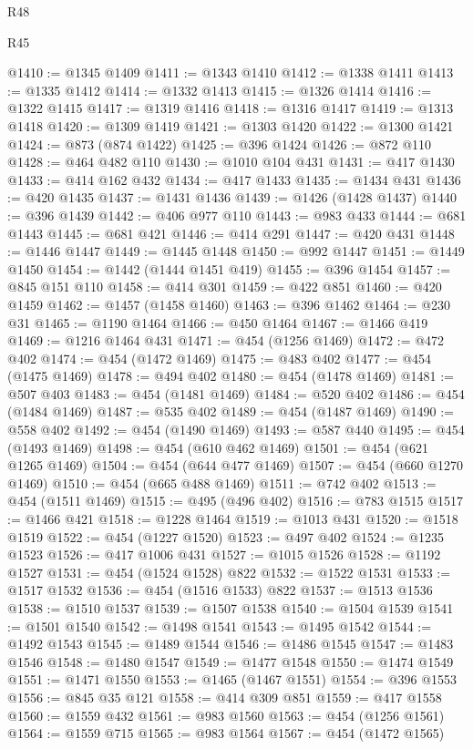 \begin{lexlean}{R48}
\begin{lexlean}{R45}
\begin{coremodule}
{{{{{{{{{{{{{{{{{{{{{{{{{{{{{{{{{{{{{{{{{{{{{{{{{{{{{{{{{{{{{{{{{{{{{{{{{{{{{{{{{{{{{{{{{{{@1410 := @1345 @1409
@1411 := @1343 @1410
@1412 := @1338 @1411
@1413 := @1335 @1412
@1414 := @1332 @1413
@1415 := @1326 @1414
@1416 := @1322 @1415
@1417 := @1319 @1416
@1418 := @1316 @1417
@1419 := @1313 @1418
@1420 := @1309 @1419
@1421 := @1303 @1420
@1422 := @1300 @1421
@1424 := @873 (@874 @1422)
@1425 := @396 @1424
@1426 := @872 @110
@1428 := @464 @482 @110
@1430 := @1010 @104 @431
@1431 := @417 @1430
@1433 := @414 @162 @432
@1434 := @417 @1433
@1435 := @1434 @431
@1436 := @420 @1435
@1437 := @1431 @1436
@1439 := @1426 (@1428 @1437)
@1440 := @396 @1439
@1442 := @406 @977 @110
@1443 := @983 @433
@1444 := @681 @1443
@1445 := @681 @421
@1446 := @414 @291
@1447 := @420 @431
@1448 := @1446 @1447
@1449 := @1445 @1448
@1450 := @992 @1447
@1451 := @1449 @1450
@1454 := @1442 (@1444 @1451 @419)
@1455 := @396 @1454
@1457 := @845 @151 @110
@1458 := @414 @301
@1459 := @422 @851
@1460 := @420 @1459
@1462 := @1457 (@1458 @1460)
@1463 := @396 @1462
@1464 := @230 @31
@1465 := @1190 @1464
@1466 := @450 @1464
@1467 := @1466 @419
@1469 := @1216 @1464 @431
@1471 := @454 (@1256 @1469)
@1472 := @472 @402
@1474 := @454 (@1472 @1469)
@1475 := @483 @402
@1477 := @454 (@1475 @1469)
@1478 := @494 @402
@1480 := @454 (@1478 @1469)
@1481 := @507 @403
@1483 := @454 (@1481 @1469)
@1484 := @520 @402
@1486 := @454 (@1484 @1469)
@1487 := @535 @402
@1489 := @454 (@1487 @1469)
@1490 := @558 @402
@1492 := @454 (@1490 @1469)
@1493 := @587 @440
@1495 := @454 (@1493 @1469)
@1498 := @454 (@610 @462 @1469)
@1501 := @454 (@621 @1265 @1469)
@1504 := @454 (@644 @477 @1469)
@1507 := @454 (@660 @1270 @1469)
@1510 := @454 (@665 @488 @1469)
@1511 := @742 @402
@1513 := @454 (@1511 @1469)
@1515 := @495 (@496 @402)
@1516 := @783 @1515
@1517 := @1466 @421
@1518 := @1228 @1464
@1519 := @1013 @431
@1520 := @1518 @1519
@1522 := @454 (@1227 @1520)
@1523 := @497 @402
@1524 := @1235 @1523
@1526 := @417 @1006 @431
@1527 := @1015 @1526
@1528 := @1192 @1527
@1531 := @454 (@1524 @1528) @822
@1532 := @1522 @1531
@1533 := @1517 @1532
@1536 := @454 (@1516 @1533) @822
@1537 := @1513 @1536
@1538 := @1510 @1537
@1539 := @1507 @1538
@1540 := @1504 @1539
@1541 := @1501 @1540
@1542 := @1498 @1541
@1543 := @1495 @1542
@1544 := @1492 @1543
@1545 := @1489 @1544
@1546 := @1486 @1545
@1547 := @1483 @1546
@1548 := @1480 @1547
@1549 := @1477 @1548
@1550 := @1474 @1549
@1551 := @1471 @1550
@1553 := @1465 (@1467 @1551)
@1554 := @396 @1553
@1556 := @845 @35 @121
@1558 := @414 @309 @851
@1559 := @417 @1558
@1560 := @1559 @432
@1561 := @983 @1560
@1563 := @454 (@1256 @1561)
@1564 := @1559 @715
@1565 := @983 @1564
@1567 := @454 (@1472 @1565)
}}}}}}}}}}}}}}}}}}}}}}}}}}}}}}}}}}}}}}}}}}}}}}}}}}}}}}}}}}}}}}}}}}}}}}}}}}}}}}}}}}}}}}}}}}}
\end{coremodule}
\end{lexlean}
\end{lexlean}
